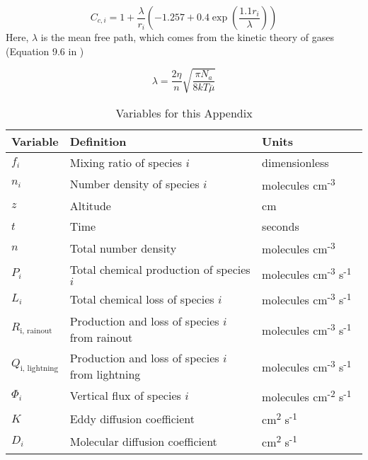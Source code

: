 \begin{equation} \label{eq:slip_correction}
  C_{c,i} = 1 + \frac{\lambda}{r_i}\left( -1.257 + 0.4 \exp \left(\frac{1.1 r_i}{\lambda}\right) \right)
\end{equation}
Here, $\lambda$ is the mean free path, which comes from the kinetic theory of gases (Equation 9.6 in \citet{Seinfeld_2006})

\begin{equation}
  \lambda = \frac{2 \eta}{n} \sqrt{\frac{\pi N_a}{8 k T \overline{\mu}}}
\end{equation}

\begin{table}
  \centering
  \begin{tabularx}{\linewidth}{p{0.15\linewidth} | p{0.55\linewidth} | p{0.3\linewidth}} \caption{Variables for this Appendix} \label{tab:appendix_variables} \\
  \hline \hline
  Variable & Definition & Units \\
  \hline
  \(f_{i}\) & Mixing ratio of species \(i\) & dimensionless \\
  \(n_{i}\) & Number density of species \(i\) & molecules
  cm\textsuperscript{-3} \\
  \(z\) & Altitude & cm \\
  \(t\) & Time & seconds \\
  \(n\) & Total number density & molecules
  cm\textsuperscript{-3} \\
  \(P_{i}\) & Total chemical production of species \(i\) & molecules
  cm\textsuperscript{-3} s\textsuperscript{-1} \\
  \(L_{i}\) & Total chemical loss of species \(i\) & molecules
  cm\textsuperscript{-3} s\textsuperscript{-1} \\
  \(R_{\text{i, rainout}}\) & Production and loss of species \(i\) from
  rainout & molecules cm\textsuperscript{-3}
  s\textsuperscript{-1} \\
  \(Q_{\text{i, lightning}}\) & Production and loss of species \(i\)
  from lightning & molecules cm\textsuperscript{-3}
  s\textsuperscript{-1} \\
  \(\Phi_{i}\) & Vertical flux of species \(i\) & molecules
  cm\textsuperscript{-2} s\textsuperscript{-1} \\
  \(K\) & Eddy diffusion coefficient & cm\textsuperscript{2}
  s\textsuperscript{-1} \\
  \(D_{i}\) & Molecular diffusion coefficient & cm\textsuperscript{2}
  s\textsuperscript{-1} \\

\end{tabularx}
\end{table}
